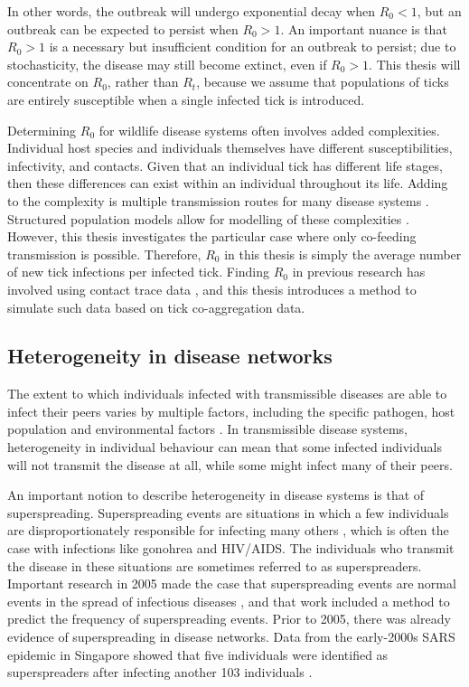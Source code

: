 \documentclass[hidelinks]{article}
\begin{document}
In other words, the outbreak will undergo exponential decay when $ R_0 < 1 $, but an outbreak can be expected to persist when $ R_0 > 1 $. An important nuance is that $ R_0 > 1 $ is a necessary but insufficient condition for an outbreak to persist; due to stochasticity, the disease may still become extinct, even if $ R_0 > 1 $. This thesis will concentrate on $ R_0 $, rather than $ R_t $, because we assume that populations of ticks are entirely susceptible when a single infected tick is introduced.

Determining $ R_0 $ for wildlife disease systems often involves added complexities. Individual host species and individuals themselves have different susceptibilities, infectivity, and contacts. Given that an individual tick has different life stages, then these differences can exist within an individual throughout its life. Adding to the complexity is multiple transmission routes for many disease systems \citep{Hartemink2008}. Structured population models allow for modelling of these complexities \citep{Diekman2000}. However, this thesis investigates the particular case where only co-feeding transmission is possible. Therefore, $ R_0 $ in this thesis is simply the average number of new tick infections per infected tick. Finding $ R_0 $ in previous research has involved using contact trace data \citep{LloydSmith2005}, and this thesis introduces a method to simulate such data based on tick co-aggregation data.

\subsection{Heterogeneity in disease networks}

The extent to which individuals infected with transmissible diseases are able to infect their peers varies by multiple factors, including the specific pathogen, host population and environmental factors \citep{LloydSmith2005}. In transmissible disease systems, heterogeneity in individual behaviour can mean that some infected individuals will not transmit the disease at all, while some might infect many of their peers.

An important notion to describe heterogeneity in disease systems is that of superspreading. Superspreading events are situations in which a few individuals are disproportionately responsible for infecting many others \citep{Galvani_2005}, which is often the case with infections like gonohrea and HIV/AIDS. The individuals who transmit the disease in these situations are sometimes referred to as superspreaders. Important research in 2005 made the case that superspreading events are normal events in the spread of infectious diseases \citep{LloydSmith2005}, and that work included a method to predict the frequency of superspreading events. Prior to 2005, there was already evidence of superspreading in disease networks. Data from the early-2000s SARS epidemic in Singapore showed that five individuals were identified as superspreaders after infecting another 103 individuals \citep{CDC2003}.
\end{document}
